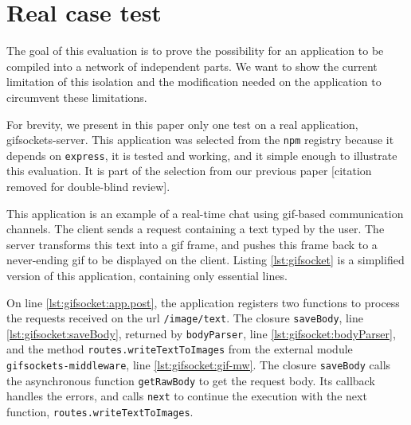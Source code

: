 \section{Real case test} \label{section:evaluation}

The goal of this evaluation is to prove the possibility for an application to be compiled into a network of independent parts.
We want to show the current limitation of this isolation and the modification needed on the application to circumvent these limitations.

For brevity, we present in this paper only one test on a real application, gifsockets-server.
This application was selected from the \texttt{npm} registry because it depends on \texttt{express}, it is tested and working, and it simple enough to illustrate this evaluation.
It is part of the selection from our previous paper [citation removed for double-blind review].%

This application is an example of a real-time chat using gif-based communication channels.
The client sends a request containing a text typed by the user.
The server transforms this text into a gif frame, and pushes this frame back to a never-ending gif to be displayed on the client.
Listing \ref{lst:gifsocket} is a simplified version of this application, containing only essential lines.

On line \ref{lst:gifsocket:app.post}, the application registers two functions to process the requests received on the url \texttt{/image/text}.
The closure \texttt{saveBody}, line \ref{lst:gifsocket:saveBody}, returned by \texttt{bodyParser}, line \ref{lst:gifsocket:bodyParser}, and the method \texttt{routes.write\-Text\-To\-Images} from the external module \texttt{gifsockets-middleware}, line \ref{lst:gifsocket:gif-mw}.
The closure \texttt{saveBody} calls the asynchronous function \texttt{getRawBody} to get the request body.
Its callback handles the errors, and calls \texttt{next} to continue the execution with the next function, \texttt{routes.write\-Text\-To\-Images}.

